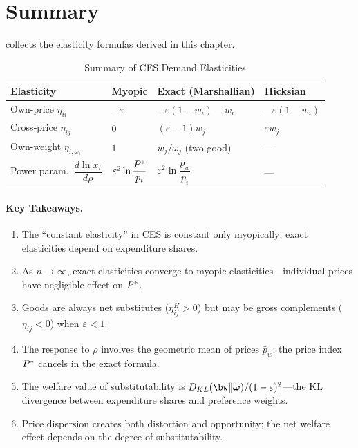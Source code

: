 \section{Summary}
\label{sec:cs-summary}

 collects the elasticity formulas derived in this chapter.

\begin{table}[H]
\centering
\caption{Summary of CES Demand Elasticities}
\label{tab:elasticity-summary}
\begin{tabular}{@{}llll@{}}
\toprule
\textbf{Elasticity} & \textbf{Myopic} & \textbf{Exact (Marshallian)} & \textbf{Hicksian} \\
\midrule
Own-price $\eta_{ii}$ & $-\varepsilon$ & $-\varepsilon(1-w_i) - w_i$ & $-\varepsilon(1-w_i)$ \\[4pt]
Cross-price $\eta_{ij}$ & $0$ & $(\varepsilon - 1) w_j$ & $\varepsilon w_j$ \\[4pt]
Own-weight $\eta_{i,\omega_i}$ & $1$ & $w_j / \omega_j$ (two-good) & --- \\[4pt]
Power param.\ $\dfrac{d \ln x_i}{d\rho}$ & $\varepsilon^2 \ln\dfrac{P^{*}}{p_i}$ & $\varepsilon^2 \ln\dfrac{\bar{p}_w}{p_i}$ & --- \\
\bottomrule
\end{tabular}
\end{table}

\paragraph{Key Takeaways.}

\begin{enumerate}[label=(\roman*)]
    \item The ``constant elasticity'' in CES is constant only myopically; exact elasticities depend on expenditure shares.
    
    \item As $n \to \infty$, exact elasticities converge to myopic elasticities---individual prices have negligible effect on $P^{*}$.
    
    \item Goods are always net substitutes ($\eta_{ij}^H > 0$) but may be gross complements ($\eta_{ij} < 0$) when $\varepsilon < 1$.
    
    \item The response to $\rho$ involves the geometric mean of prices $\bar{p}_w$; the price index $P^{*}$ cancels in the exact formula.
    
    \item The welfare value of substitutability is $D_{KL}(\bw \| \bom) / (1-\varepsilon)^2$---the KL divergence between expenditure shares and preference weights.
    
    \item Price dispersion creates both distortion and opportunity; the net welfare effect depends on the degree of substitutability.
\end{enumerate}
